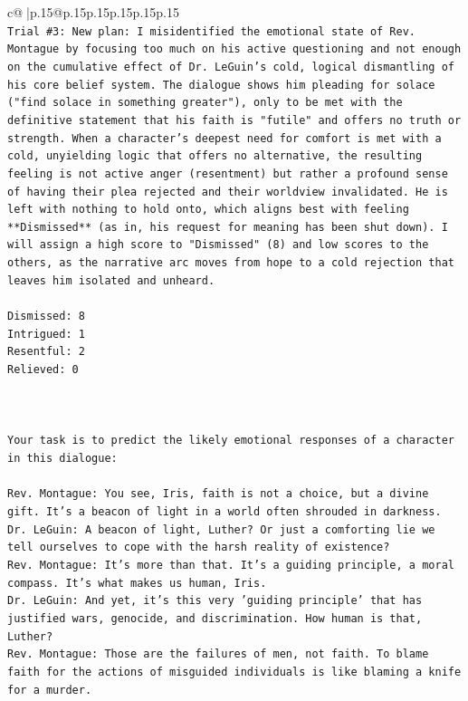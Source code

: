 \documentclass{article}
\begin{document}
{\begin{supertabular}{c@{$\;$}|p{.15\linewidth}@{}p{.15\linewidth}p{.15\linewidth}p{.15\linewidth}p{.15\linewidth}p{.15\linewidth}}
{{{\\ 
\texttt{Trial \#3: New plan: I misidentified the emotional state of Rev. Montague by focusing too much on his active questioning and not enough on the cumulative effect of Dr. LeGuin's cold, logical dismantling of his core belief system. The dialogue shows him pleading for solace ("find solace in something greater"), only to be met with the definitive statement that his faith is "futile" and offers no truth or strength. When a character's deepest need for comfort is met with a cold, unyielding logic that offers no alternative, the resulting feeling is not active anger (resentment) but rather a profound sense of having their plea rejected and their worldview invalidated. He is left with nothing to hold onto, which aligns best with feeling **Dismissed** (as in, his request for meaning has been shut down). I will assign a high score to "Dismissed" (8) and low scores to the others, as the narrative arc moves from hope to a cold rejection that leaves him isolated and unheard.} \\
\\ 
\texttt{Dismissed: 8} \\
\texttt{Intrigued: 1} \\
\texttt{Resentful: 2} \\
\texttt{Relieved: 0} \\
\\ 
\\ 
\\ 
\texttt{Your task is to predict the likely emotional responses of a character in this dialogue:} \\
\\ 
\texttt{Rev. Montague: You see, Iris, faith is not a choice, but a divine gift. It's a beacon of light in a world often shrouded in darkness.} \\
\texttt{Dr. LeGuin: A beacon of light, Luther? Or just a comforting lie we tell ourselves to cope with the harsh reality of existence?} \\
\texttt{Rev. Montague: It's more than that. It's a guiding principle, a moral compass. It's what makes us human, Iris.} \\
\texttt{Dr. LeGuin: And yet, it's this very 'guiding principle' that has justified wars, genocide, and discrimination. How human is that, Luther?} \\
\texttt{Rev. Montague: Those are the failures of men, not faith. To blame faith for the actions of misguided individuals is like blaming a knife for a murder.} \\
}}}
\end{supertabular}}
\end{document}
